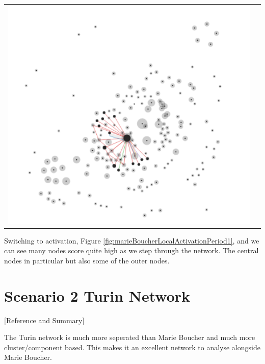 \begin{center}
\begin{tabular}{cc}
\includegraphics[trim={0 0 0 0}, width=140mm]{./Figures/marieBoucherLocalActivationPeriod1.png}
\end{tabular}
\label{fig:marieBoucherLocalActivationPeriod1}
\end{center} 
Switching to activation, Figure \ref{fig:marieBoucherLocalActivationPeriod1}, and we can see many nodes score quite high as we step through the network. The central nodes in particular but also some of the outer nodes.

\section{Scenario 2 Turin Network}

[Reference and Summary]

The Turin network is much more seperated than Marie Boucher and much more cluster/component based. This makes it an excellent network to analyse alongside Marie Boucher.

